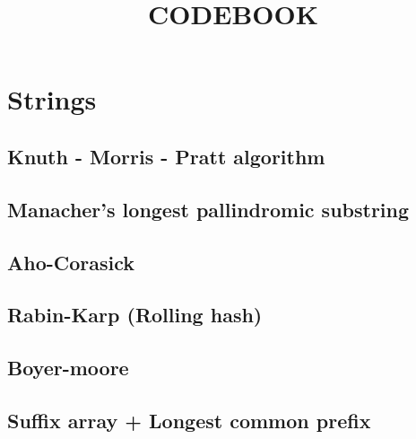 \documentclass[a4paper]{article}
\begin{document}
\renewcommand\familydefault{\sfdefault}

\title{\LARGE\bfseries\sffamily CODEBOOK}
\date{}
\maketitle

\setlength{\parskip}{0.0in}

\renewcommand{\cftsecfont}{\large\sffamily\bfseries}
\renewcommand{\cftsubsecfont}{\large\sffamily}
\tableofcontents

\newpage

\setlength{\parskip}{0.1in}

\section{Strings}
    \subsection{Knuth - Morris - Pratt algorithm}
        
    \subsection{Manacher's longest pallindromic substring}
        
    \subsection{Aho-Corasick}
        
    \subsection{Rabin-Karp (Rolling hash)}
        
    \subsection{Boyer-moore}
        
    \subsection{Suffix array + Longest common prefix}
        
\end{document}
